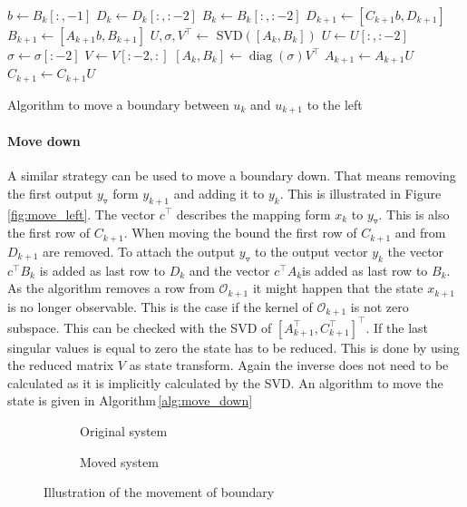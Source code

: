\documentclass[doctype=mastersthesis,BCOR=15mm,biblatex]{ldvbook}%
\DeclareMathOperator{\diag}{diag}
\newcommand{\Ob}{\mathcal{O}} %
\newcommand{\m}{\triangledown} %
\begin{document}
\begin{algorithm}[htb]
	\begin{algorithmic}
		\State $b \gets B_k[:,-1]$
		\State $D_k \gets D_k[:,:-2]$
		\State $B_k \gets B_k[:,:-2]$
		\State $D_{k+1} \gets [C_{k+1}b,D_{k+1}]$
		\State $B_{k+1} \gets [A_{k+1}b,B_{k+1}]$
		\State $U,\sigma,V^\top \gets$ SVD$([A_k,B_k])$ 
			\State $U \gets U[:,:-2]$
			\State $\sigma \gets \sigma[:-2]$
			\State $V \gets V[:-2,:]$
			\State$[A_k,B_k] \gets \diag(\sigma) V^\top$
			\State$A_{k+1} \gets A_{k+1}U$
			\State$C_{k+1} \gets C_{k+1}U$
		\EndIf
	\end{algorithmic}
	\caption{Algorithm to move a boundary between $u_k$ and $u_{k+1}$ to the left}\label{alg:move_left}
\end{algorithm}

\paragraph{Move down}
A similar strategy can be used to move a boundary down.
That means removing the first output $y_\m$ form $y_{k+1}$ and adding it to $y_k$.
This is illustrated in Figure\,\ref{fig:move_left}.
The vector $c^\top$ describes the mapping form $x_k$ to $y_\m$.
This is also the first row of $C_{k+1}$.
When moving the bound the first row of $C_{k+1}$ and from $D_{k+1}$ are removed.
To attach the output $y_\m$ to the output vector $y_k$ the vector $c^\top B_k$ is added as last row to $D_k$ and the vector $c^\top A_k$is added as last row to $B_k$.
As the algorithm removes a row from $\Ob_{k+1}$ it might happen that the state $x_{k+1}$ is no longer observable.
This is the case if the kernel of $\Ob_{k+1}$ is not zero subspace.
This can be checked with the SVD of $[A_{k+1}^\top,C_{k+1}^\top]^\top$.
If the last singular values is equal to zero the state has to be reduced.
This is done by using the reduced matrix $V$ as state transform.
Again the inverse does not need to be calculated as it is implicitly calculated by the SVD.
An algorithm to move the state is given in Algorithm\,\ref{alg:move_down}



\begin{figure}[htb]
	\centering
	
	\begin{subfigure}[b]{0.45\textwidth}
		\caption{Original system}
		\label{fig:move_down_a}
	\end{subfigure}
	\hspace{0.8cm}
	\begin{subfigure}[b]{0.45\textwidth}
		\caption{Moved system}
		\label{fig:move_down_b}
	\end{subfigure}
	\caption{Illustration of the movement of boundary}
	\label{fig:move_down}
\end{figure}
\end{document}
